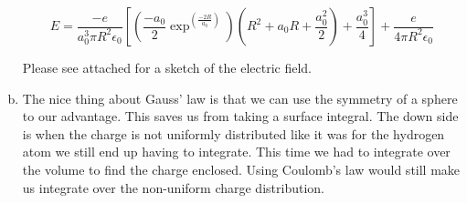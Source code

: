 \documentclass[11pt]{article}
\numberwithin{equation}{section}
\begin{document}
\begin{enumerate}[(a)]
$$E = \frac{-e}{a_0^3 \pi R^2\epsilon_0}\left[\left(\frac{-a_0}{2}\exp^{\left(\frac{-2R}{a_0}\right)}\right)\left(R^2 + a_0 R+ \frac{a_0^2}{2}\right) + \frac{a_0^3}{4}\right]+ \frac{e}{4\pi R^2\epsilon_0}$$

Please see attached for a sketch of the electric field.
\item 
The nice thing about Gauss' law is that we can use the symmetry of a sphere to our advantage. This saves us from taking a surface integral. The down side is when the charge is not uniformly distributed like it was for the hydrogen atom we still end up having to integrate. This time we had to integrate over the volume to find the charge enclosed. Using Coulomb's law would still make us integrate over the non-uniform charge distribution.
\end{enumerate}
\end{document}
